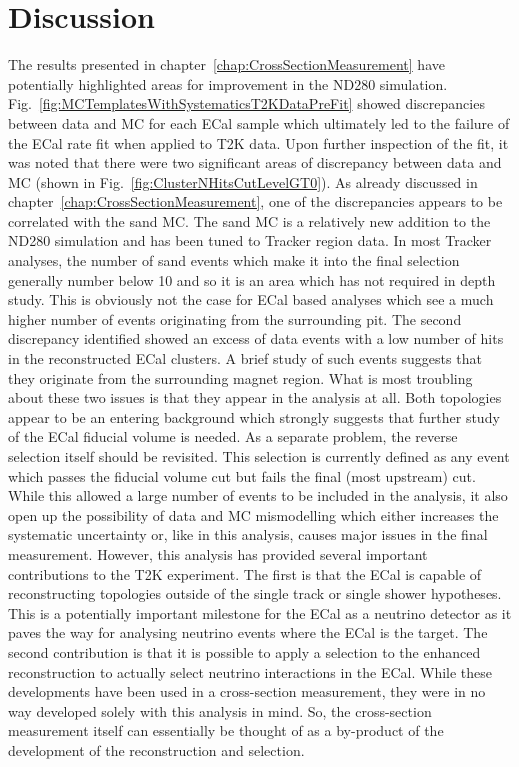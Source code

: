 \section{Discussion}
\label{sec:Discussion}
The results presented in chapter~\ref{chap:CrossSectionMeasurement} have potentially highlighted areas for improvement in the ND280 simulation.  Fig.~\ref{fig:MCTemplatesWithSystematicsT2KDataPreFit} showed discrepancies between data and MC for each ECal sample which ultimately led to the failure of the ECal rate fit when applied to T2K data.  Upon further inspection of the fit, it was noted that there were two significant areas of discrepancy between data and MC (shown in Fig.~\ref{fig:ClusterNHitsCutLevelGT0}).
\newline
\newline
As already discussed in chapter~\ref{chap:CrossSectionMeasurement}, one of the discrepancies appears to be correlated with the sand MC.  The sand MC is a relatively new addition to the ND280 simulation and has been tuned to Tracker region data.  In most Tracker analyses, the number of sand events which make it into the final selection generally number below 10 and so it is an area which has not required in depth study.  This is obviously not the case for ECal based analyses which see a much higher number of events originating from the surrounding pit.  The second discrepancy identified showed an excess of data events with a low number of hits in the reconstructed ECal clusters.  A brief study of such events suggests that they originate from the surrounding magnet region.  What is most troubling about these two issues is that they appear in the analysis at all.  Both topologies appear to be an entering background which strongly suggests that further study of the ECal fiducial volume is needed.  
\newline
\newline
As a separate problem, the reverse selection itself should be revisited.  This selection is currently defined as any event which passes the fiducial volume cut but fails the final (most upstream) cut.  While this allowed a large number of events to be included in the analysis, it also open up the possibility of data and MC mismodelling which either increases the systematic uncertainty or, like in this analysis, causes major issues in the final measurement.
\newline
\newline
However, this analysis has provided several important contributions to the T2K experiment.  The first is that the ECal is capable of reconstructing topologies outside of the single track or single shower hypotheses.  This is a potentially important milestone for the ECal as a neutrino detector as it paves the way for analysing neutrino events where the ECal is the target.  The second contribution is that it is possible to apply a selection to the enhanced reconstruction to actually select neutrino interactions in the ECal.  While these developments have been used in a cross-section measurement, they were in no way developed solely with this analysis in mind.  So, the cross-section measurement itself can essentially be thought of as a by-product of the development of the reconstruction and selection.

